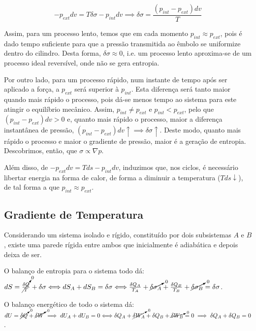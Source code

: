 \begin{equation*}
    -p_{ext} dv = T \delta \sigma - p_{int} dv \implies \delta \sigma = \frac{(p_{int} - p_{ext}) dv}{T}
\end{equation*}

Assim, para um processo lento, temos que em cada momento $p_{int} \approx p_{ext}$, pois é dado tempo suficiente para que a pressão transmitida ao êmbolo se uniformize dentro do cilindro. Desta forma, $\delta \sigma \approx 0$, i.e. um processo lento aproxima-se de um processo ideal reversível, onde não se gera entropia.

Por outro lado, para um processo rápido, num instante de tempo após ser aplicado a força, a $p_{ext}$ será superior à $p_{int}$. Esta diferença será tanto maior quando mais rápido o processo, pois dá-se menos tempo ao sistema para este atingir o equilíbrio mecânico. Assim, $p_{int} \neq p_{ext}$ e $p_{int} < p_{ext}$, pelo que $(p_{int} - p_{ext})dv > 0$ e, quanto mais rápido o processo, maior a diferença instantânea de pressão, $(p_{int} - p_{ext})dv \uparrow \implies \delta \sigma \uparrow$. Deste modo, quanto mais rápido o processo e maior o gradiente de pressão, maior é a geração de entropia. Descobrimos, então, que $\sigma \propto \nabla p$.

Além disso, de $-p_{ext} dv = T ds - p_{int} dv$, induzimos que, nos ciclos, é necessário libertar energia na forma de calor, de forma a diminuir a temperatura ($Tds \downarrow$), de tal forma a que $p_{int} \approx p_{ext}$.

\subsection{Gradiente de Temperatura}

Considerando um sistema isolado e rígido, constituído por dois subsistemas $A$ e $B$, existe uma parede rígida entre ambos que inicialmente é adiabática e depois deixa de ser.

O balanço de entropia para o sistema todo dá: $dS = \cancelto{0}{\frac{\delta Q}{T}} + \delta \sigma \Longleftrightarrow dS_A + dS_B = \delta \sigma \Longleftrightarrow \frac{\delta Q_A}{T_A} + \cancelto{0}{\delta \sigma_A} + \frac{\delta Q_B}{T_B} + \cancelto{0}{\delta \sigma_B} = \delta \sigma$.

O balanço energético de todo o sistema dá: $dU = \cancelto{0}{\delta Q} + \cancelto{0}{\delta W} \implies dU_A + dU_B = 0 \Longleftrightarrow \delta Q_A + \cancelto{0}{\delta W_A} + \delta Q_B + \cancelto{0}{\delta W_B} = 0 \implies \delta Q_A + \delta Q_B = 0$.


